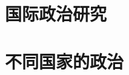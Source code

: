 \documentclass[UTF8]{RepresentationUniverse}
\begin{document}
\section{国际政治研究}

\section{不同国家的政治}
\end{document}
